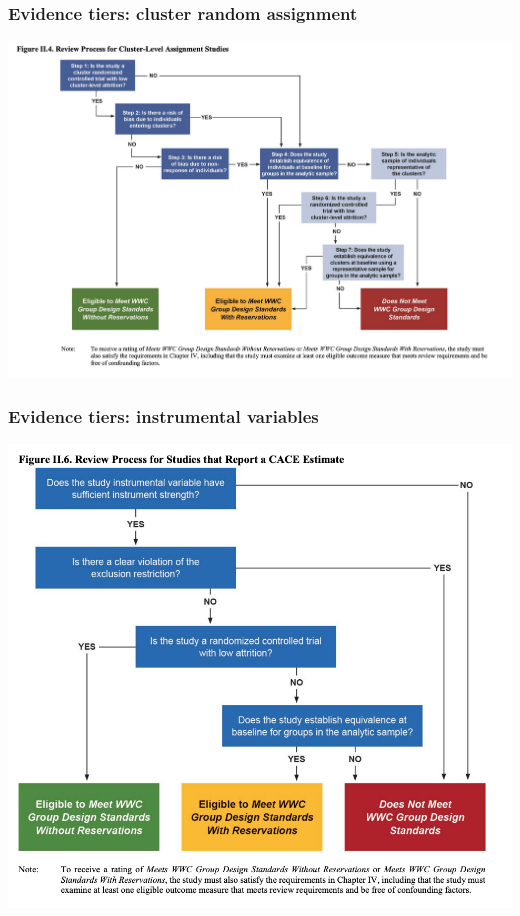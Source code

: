 \documentclass[usenames,dvipsnames]{beamer}
\begin{document}

\begin{frame}[label= doe_cluster]
\frametitle{Evidence tiers: cluster random assignment}

\begin{center}
\vspace{-0.85cm}
\hspace*{-1cm}
\includegraphics[scale=0.5]{../figs/DoE_clusters.png} 
\end{center}

\end{frame}


\begin{frame}[label= doe_iv]
\frametitle{Evidence tiers: instrumental variables}

\begin{center}
\vspace{-0.35cm}
\includegraphics[scale=0.62]{../figs/DoE_CACE_IV.png} 
\end{center}

\end{frame}
\end{document}
